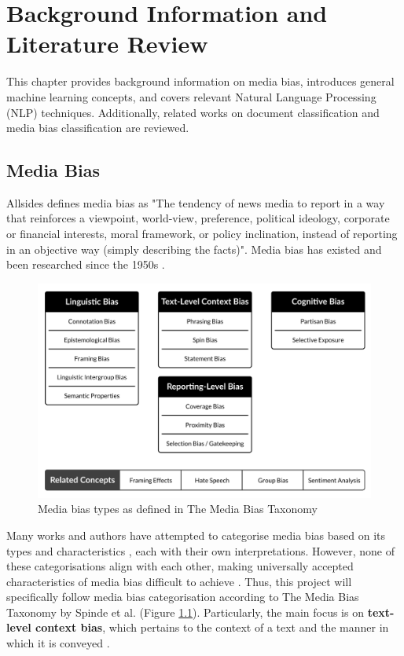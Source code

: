 \chapter{Background Information and Literature Review}
\label{cha:2}

This chapter provides background information on media bias, introduces general machine learning concepts, and covers relevant Natural Language Processing (NLP) techniques. Additionally, related works on document classification and media bias classification are reviewed.


\section{Media Bias}

Allsides \cite{allsides-2022-bias-definition} defines media bias as "The tendency of news media to report in a way that reinforces a viewpoint, world-view, preference, political ideology, corporate or financial interests, moral framework, or policy inclination, instead of reporting in an objective way (simply describing the facts)". Media bias has existed and been researched since the 1950s \cite{white-1950-case-study-selection-news}.

\begin{figure}[htbp]
    \centering
    \includegraphics[width=0.9\linewidth]{images/bias-types-taxonomy.png}
    \caption{Media bias types as defined in The Media Bias Taxonomy \cite{spinde-2024-taxonomy}}
    \label{fig:media-bias-taxonomy}
\end{figure}

Many works and authors have attempted to categorise media bias based on its types and characteristics \cite{rodrigo-2024-systematic-review-media-bias,eberl-2017-bias-political,spinde-2024-taxonomy,allsides-media-bias-types}, each with their own interpretations. However, none of these categorisations align with each other, making universally accepted characteristics of media bias difficult to achieve \cite{rodrigo-2024-systematic-review-media-bias}. Thus, this project will specifically follow media bias categorisation according to The Media Bias Taxonomy by Spinde et al. (Figure \ref{fig:media-bias-taxonomy}). Particularly, the main focus is on \textbf{text-level context bias}, which pertains to the context of a text and the manner in which it is conveyed \cite{spinde-2024-taxonomy}.

